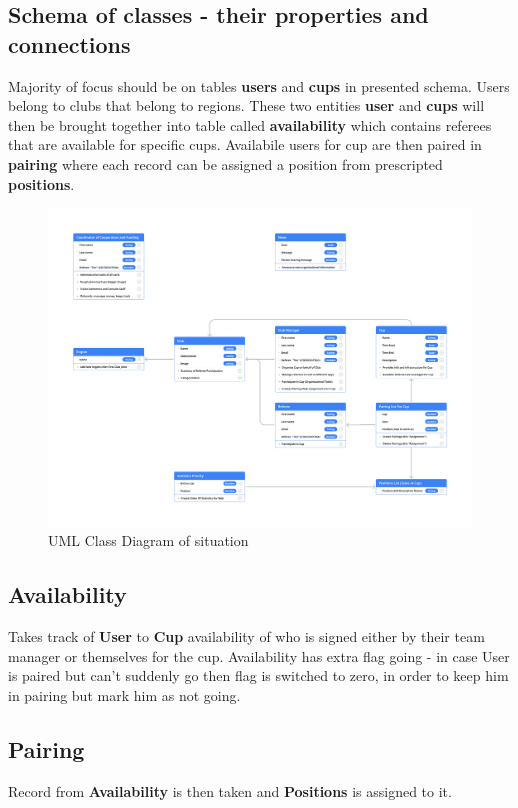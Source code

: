 \subsection*{Schema of classes - their properties and connections}
Majority of focus should be on tables \textbf{users} and \textbf{cups} in presented schema. Users belong to clubs that belong to regions. These two entities \textbf{user} and \textbf{cups} will then be brought together into table called \textbf{availability} which contains referees that are available for specific cups. Availabile users for cup are then paired in \textbf{pairing} where each record can be assigned a position from prescripted \textbf{positions}.
\newline
\begin{figure}[h]
\includegraphics[scale=0.160]{img/swimmpair_uml.png}
  \caption{UML Class Diagram of situation}
  \label{fig1.2:uml}
\end{figure}
\subsection*{Availability}
Takes track of \textbf{User} to \textbf{Cup} availability of who is signed either by their team manager or themselves for the cup. Availability has extra flag going - in case User is paired but can't suddenly go then flag is switched to zero, in order to keep him in pairing but mark him as not going.
\subsection*{Pairing}
Record from \textbf{Availability} is then taken and \textbf{Positions} is assigned to it. 

